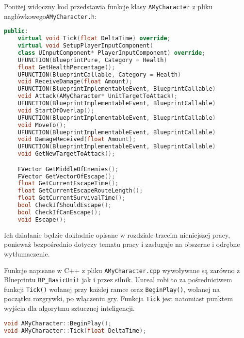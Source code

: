 \documentclass[12pt]{report}
\begin{document}
Poniżej widoczny kod przedstawia funkcje klasy \texttt{AMyCharacter} z pliku nagłówkowego\texttt{AMyCharacter.h}: 
\begin{lstlisting}[language=C++, backgroundcolor=\color{black!5}, basicstyle=\footnotesize, caption= Funkcje klasy AMyCharacter z pliku nagłówkowego \texttt{AMyCharacter.h}]
public:
	virtual void Tick(float DeltaTime) override;
	virtual void SetupPlayerInputComponent(
	class UInputComponent* PlayerInputComponent) override;
	UFUNCTION(BlueprintPure, Category = Health)
	float GetHealthPercentage();
	UFUNCTION(BlueprintCallable, Category = Health)
	void ReceiveDamage(float Amount);
	UFUNCTION(BlueprintImplementableEvent, BlueprintCallable)
	void Attack(AMyCharacter* UnitTargetToAttack);
	UFUNCTION(BlueprintImplementableEvent, BlueprintCallable)
	void StartOfOverlap();
	UFUNCTION(BlueprintImplementableEvent, BlueprintCallable)
	void MoveTo();
	UFUNCTION(BlueprintImplementableEvent, BlueprintCallable)
	void DamageReceived(float Amount);
	UFUNCTION(BlueprintImplementableEvent, BlueprintCallable)
	void GetNewTargetToAttack();

	FVector GetMiddleOfEnemies();
	FVector GetVectorOfEscape();
	float GetCurrentEscapeTime();
	float GetCurrentEscapeRouteLength();
	float GetCurrentSurvivalTime();
	bool CheckIfShouldEscape();
	bool CheckIfCanEscape();
	void Escape();
\end{lstlisting}
Ich działanie będzie dokładnie opisane w rozdziale trzecim nieniejszej pracy, ponieważ bezpośrednio dotyczy tematu pracy i zasługuje na obszerne i odrębne wytłumaczenie.

Funkcje napisane w C++ z pliku \texttt{AMyCharacter.cpp} wywoływane są zarówno z Blueprintu \texttt{BP\_BasicUnit} jak i przez silnik. Unreal robi to za pośrednictwem funkcji \texttt{\texttt{Tick}()} wołanej przy każdej ramce oraz \texttt{BeginPlay()}, wołanej na początku rozgrywki, po włączeniu gry. Funkcja \texttt{Tick} jest natomiast punktem wyjścia dla algorytmu sztucznej inteligencji. 
\begin{lstlisting}[language=C++, backgroundcolor=\color{black!5}, basicstyle=\footnotesize, caption= Funkcje wołane przez silnik w pliku \texttt{AMyCharacter.h}]
void AMyCharacter::BeginPlay();
void AMyCharacter::Tick(float DeltaTime);
\end{lstlisting}
\end{document}
